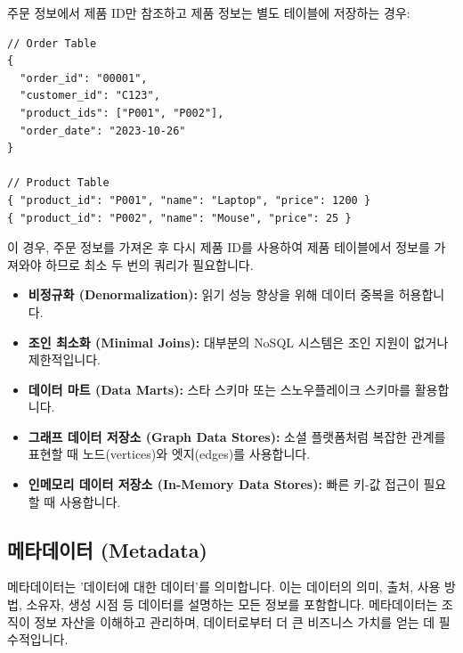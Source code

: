 \documentclass[11pt,a4paper]{article}
\begin{document}
\begin{examplebox}[examplebox, title=데이터 참조 예시]
주문 정보에서 제품 ID만 참조하고 제품 정보는 별도 테이블에 저장하는 경우:
\begin{verbatim}
// Order Table
{
  "order_id": "00001",
  "customer_id": "C123",
  "product_ids": ["P001", "P002"],
  "order_date": "2023-10-26"
}

// Product Table
{ "product_id": "P001", "name": "Laptop", "price": 1200 }
{ "product_id": "P002", "name": "Mouse", "price": 25 }
\end{verbatim}
이 경우, 주문 정보를 가져온 후 다시 제품 ID를 사용하여 제품 테이블에서 정보를 가져와야 하므로 최소 두 번의 쿼리가 필요합니다.
\end{examplebox}

\begin{tcolorbox}[mybox, title=NoSQL 모델링 규칙]
\begin{itemize}
    \item \textbf{비정규화 (Denormalization):} 읽기 성능 향상을 위해 데이터 중복을 허용합니다.
    \item \textbf{조인 최소화 (Minimal Joins):} 대부분의 NoSQL 시스템은 조인 지원이 없거나 제한적입니다.
    \item \textbf{데이터 마트 (Data Marts):} 스타 스키마 또는 스노우플레이크 스키마를 활용합니다.
    \item \textbf{그래프 데이터 저장소 (Graph Data Stores):} 소셜 플랫폼처럼 복잡한 관계를 표현할 때 노드(vertices)와 엣지(edges)를 사용합니다.
    \item \textbf{인메모리 데이터 저장소 (In-Memory Data Stores):} 빠른 키-값 접근이 필요할 때 사용합니다.
\end{itemize}
\end{tcolorbox}

\subsection{메타데이터 (Metadata)}

\begin{tcolorbox}[mybox, title=메타데이터란?]
메타데이터는 '데이터에 대한 데이터'를 의미합니다. 이는 데이터의 의미, 출처, 사용 방법, 소유자, 생성 시점 등 데이터를 설명하는 모든 정보를 포함합니다. 메타데이터는 조직이 정보 자산을 이해하고 관리하며, 데이터로부터 더 큰 비즈니스 가치를 얻는 데 필수적입니다.
\end{tcolorbox}
\end{document}
